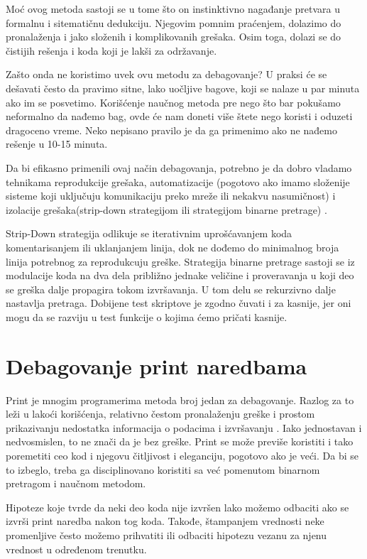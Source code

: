 \documentclass[a4paper]{article}
\begin{document}
	Moć ovog metoda sastoji se u tome što on instinktivno nagađanje pretvara u formalnu i sitematičnu dedukciju. Njegovim pomnim praćenjem, dolazimo do pronalaženja i jako složenih i komplikovanih grešaka. Osim toga, dolazi se do čistijih rešenja i koda koji je lakši za održavanje.
	
	Zašto onda ne koristimo uvek ovu metodu za debagovanje? \cite{proPyDeb} U praksi će se dešavati često da pravimo sitne, lako uočljive bagove, koji se nalaze u par minuta ako im se posvetimo. Korišćenje naučnog metoda pre nego što bar pokušamo neformalno da nađemo bag, ovde će nam doneti više štete nego koristi i oduzeti dragoceno vreme. Neko nepisano pravilo je da ga primenimo ako ne nađemo rešenje u 10-15 minuta. 
	
	Da bi efikasno primenili ovaj način debagovanja, potrebno je da dobro vladamo tehnikama reprodukcije grešaka, automatizacije (pogotovo ako imamo složenije sisteme koji uključuju komunikaciju preko mreže ili nekakvu nasumičnost) i izolacije grešaka(strip-down strategijom ili strategijom binarne pretrage) \cite{proPyDeb}.
	
	Strip-Down strategija odlikuje se iterativnim uprošćavanjem koda komentarisanjem ili uklanjanjem linija, dok ne dođemo do minimalnog broja linija potrebnog za  reprodukcuju greške. Strategija binarne pretrage sastoji se iz modulacije koda na dva dela približno jednake veličine i proveravanja u koji deo se greška dalje propagira tokom izvršavanja. U tom delu se rekurzivno dalje nastavlja pretraga. Dobijene test skriptove je zgodno čuvati i za kasnije, jer oni mogu da se razviju u test funkcije o kojima ćemo pričati kasnije.

\section{Debagovanje print naredbama}
Print je mnogim programerima metoda broj jedan za debagovanje. Razlog za to leži u lakoći korišćenja, relativno čestom pronalaženju greške i prostom prikazivanju nedostatka informacija o podacima i izvršavanju \cite{proPyDeb}. Iako jednostavan i nedvosmislen, to ne znači da je bez greške. Print se može previše koristiti i tako poremetiti ceo kod i njegovu čitljivost i eleganciju, pogotovo ako je veći. Da bi  se to izbeglo, treba ga disciplinovano koristiti sa već pomenutom binarnom pretragom i naučnom metodom.

Hipoteze koje tvrde da neki deo koda nije izvršen lako možemo odbaciti ako se izvrši print naredba nakon tog koda. Takođe, štampanjem vrednosti neke promenljive često možemo prihvatiti ili odbaciti hipotezu vezanu za njenu vrednost u određenom trenutku. 
\end{document}
